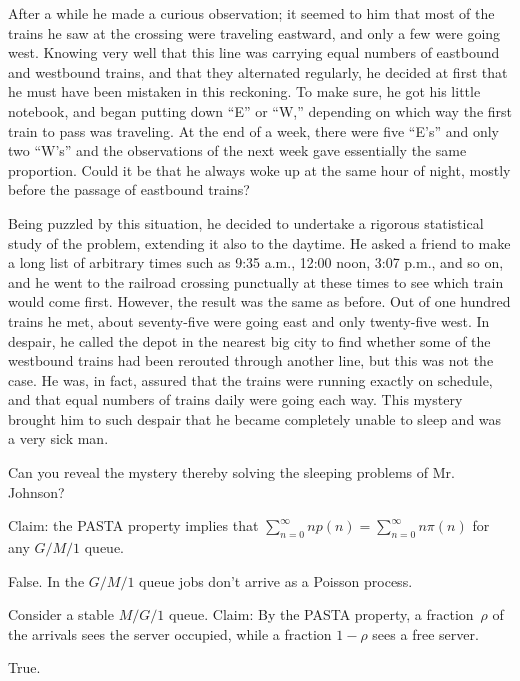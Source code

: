 \documentclass[stochastic-or.tex]{subfiles}
\begin{document}
After a while he made a curious observation; it seemed to him that most of the trains he saw at the crossing were traveling eastward, and only a few were going west.
Knowing very well that this line was carrying equal numbers of eastbound and westbound trains, and that they alternated regularly, he decided at first that he must have been mistaken in this reckoning.
To make sure, he got his little notebook, and began putting down “E” or “W,” depending on which way the first train to pass was traveling.
At the end of a week, there were five “E’s” and only two “W’s” and the observations of the next week gave essentially the same proportion.
Could it be that he always woke up at the same hour of night, mostly before the passage of eastbound trains?

Being puzzled by this situation, he decided to undertake a rigorous statistical study of the problem, extending it also to the daytime.
He asked a friend to make a long list of arbitrary times such as 9:35 a.m., 12:00 noon, 3:07 p.m., and so on, and he went to the railroad crossing punctually at these times to see which train would come first.
However, the result was the same as before.
Out of one hundred trains he met, about seventy-five were going east and only twenty-five west.
In despair, he called the depot in the nearest big city to find whether some of the westbound trains had been rerouted through another line, but this was not the case.
He was, in fact, assured that the trains were running exactly on schedule, and that equal numbers of trains daily were going each way.
This mystery brought him to such despair that he became completely unable to sleep and was a very sick man.

Can you reveal the mystery thereby solving the sleeping problems of Mr. Johnson?


\begin{truefalse}
Claim:  the PASTA property implies  that $\sum_{n=0}^\infty n p(n) = \sum_{n=0}^\infty n \pi(n)$ for any $G/M/1$ queue.
\begin{solution}
False. In the $G/M/1$ queue jobs don't arrive as a Poisson process.
\end{solution}
\end{truefalse}

\begin{truefalse}
Consider a stable $M/G/1$ queue.
Claim: By the PASTA property, a fraction~$\rho$ of the arrivals sees the server occupied, while a fraction $1-\rho$ sees a free server.
\begin{solution}
True.
\end{solution}
\end{truefalse}
\end{document}
